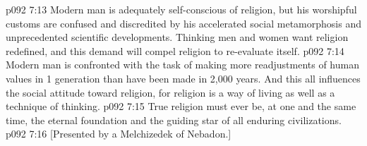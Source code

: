 \vs p092 7:13 \pc Modern man is adequately self\hyp{}conscious of religion, but his worshipful customs are confused and discredited by his accelerated social metamorphosis and unprecedented scientific developments. Thinking men and women want religion redefined, and this demand will compel religion to re\hyp{}evaluate itself.
\vs p092 7:14 Modern man is confronted with the task of making more readjustments of human values in 1 generation than have been made in 2,000 years. And this all influences the social attitude toward religion, for religion is a way of living as well as a technique of thinking.
\vs p092 7:15 \pc True religion must ever be, at one and the same time, the eternal foundation and the guiding star of all enduring civilizations.
\vsetoff
\vs p092 7:16 [Presented by a Melchizedek of Nebadon.]
\quizlink
